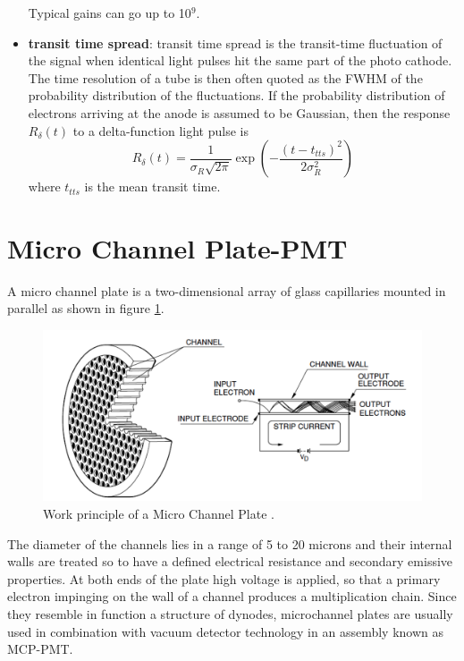 \begin{itemize}
\begin{equation}
\end{equation}
Typical gains can go up to 10$^{9}$.
\item \textbf{transit time spread}: transit time spread is the transit-time fluctuation of the signal when identical light pulses hit the same part of the photo cathode. The time resolution of a tube is then often quoted as the FWHM of the probability distribution of the fluctuations.
If the probability distribution of electrons arriving at the anode is assumed to be Gaussian, then the response $R_{\delta}(t)$ to a delta-function light pulse is
\begin{equation}
R_{\delta}(t) = \frac{1}{\sigma _{R}\sqrt {2\pi}}\exp{\left( -\frac{(t-t_{tts})^2}{2\sigma _{R}^2}\right)}
\end{equation}
where $t_{tts}$ is the mean transit time.
\end{itemize}

\section{Micro Channel Plate-PMT}
A micro channel plate is a two-dimensional array of glass capillaries mounted in parallel as shown in figure \ref{fig:MCP_schematics}.
\begin{figure}[htbp]
\begin{center}
\includegraphics[width=12cm]{../Pictures/Chapter_3/MCP_plate.png}
\end{center}
\caption[MCP principle]{Work principle of a Micro Channel Plate \cite{Hama2006}.}
\label{fig:MCP_schematics}
\end{figure}
The diameter of the channels lies in a range of 5 to 20 microns and their internal walls are treated so to have a defined electrical resistance and secondary emissive properties.
At both ends of the plate high voltage is applied, so that a primary electron impinging on the wall of a channel produces a multiplication chain.
Since they resemble in function a structure of dynodes, microchannel plates are usually used in combination with vacuum detector technology in an assembly known as MCP-PMT.

